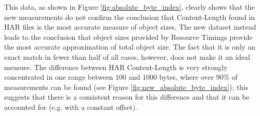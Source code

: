 This data, as shown in Figure \ref{fig:absolute_byte_index}, clearly shows that the new measurements do not confirm the conclusion that Content-Length found in HAR files is the most accurate measure of object sizes. The new dataset instead leads to the conclusion that object sizes provided by Resource Timings provide the most accurate approximation of total object size. The fact that it is only an exact match in fewer than half of all cases, however, does not make it an ideal measure. The difference between HAR Content-Length is very strongly concentrated in one range between 100 and 1000 bytes, where over 90\% of measurements can be found (see Figure \ref{fig:new_absolute_byte_index}); this suggests that there is a consistent reason for this difference and that it can be accounted for (e.g. with a constant offset).


